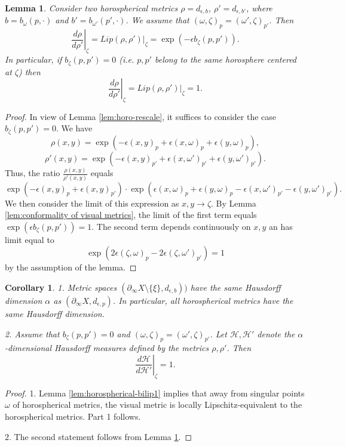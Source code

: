\documentclass[12pt]{amsbook}%
\newtheorem{lem}[thm]{Lemma}
\newtheorem{cor}[thm]{Corollary}
\theoremstyle{definition}
\theoremstyle{remark}
\numberwithin{section}{chapter}
\numberwithin{subsection}{section}
\numberwithin{figure}{chapter}
\def\eps{\epsilon}
\def\cH{{\mathscr{H}}}
\def\al{\alpha}
\def\geo{\partial_\infty}
\begin{document}
\begin{lem}\label{lem:horospherical-bilip2}
Consider two horospherical metrics $\rho=d_{\eps,b}$, $\rho'=d_{\eps,b'}$, where $b=b_\omega(p,\cdot)$ and $b'=b_{\omega'}(p',\cdot)$. We assume that
 $(\omega,\zeta)_p=(\omega',\zeta)_{p'}$. 
Then 
$$
\left. \frac{d\rho}{d\rho'}\right\vert_\zeta= \left. Lip(\rho,\rho')\right\vert_\zeta= \exp(-\eps b_\zeta(p,p')).
$$
In particular, if $b_\zeta(p,p')=0$ (i.e. $p, p'$ belong to the same horosphere centered at $\zeta$) then 
$$
\left. \frac{d\rho}{d\rho'}\right\vert_\zeta= \left. Lip(\rho,\rho')\right\vert_\zeta= 1.
$$
\end{lem}
\begin{proof} In view of Lemma \ref{lem:horo-rescale}, it suffices to consider the case $b_\zeta(p,p')=0$. We have
$$
\rho(x,y)= \exp(-\eps (x,y)_p + \eps (x,\omega)_p + \eps(y,\omega)_p),  
$$
$$
\rho'(x,y)= \exp(-\eps (x,y)_{p'} + \eps (x,\omega')_{p'} + \eps(y,\omega')_{p'}).  
$$
Thus, the ratio $\frac{\rho(x,y)}{\rho'(x,y)}$ equals
$$
\exp(-\eps (x,y)_p + \eps (x,y)_{p'})\cdot \exp( \eps (x,\omega)_p + \eps(y,\omega)_p - \eps (x,\omega')_{p'} - \eps(y,\omega')_{p'}).  
$$
We then consider the limit of this expression as $x,y\to \zeta$. By Lemma 
\ref{lem:conformality of visual metrics}, the limit of the first term equals  $\exp(\eps b_\zeta(p,p'))=1$. The second term depends 
continuously on $x, y$ an has limit equal to 
$$
\exp( 2\eps (\zeta,\omega)_p - 2\eps (\zeta,\omega')_{p'})=1 
$$
by the assumption of the lemma. 
 \end{proof}

\begin{cor}\label{cor:Hausdorff-equal}
1. Metric spaces $(\geo X\setminus \{\xi\}, d_{\eps,b}))$ have the same Hausdorff dimension $\al$ as $(\geo X, d_{\eps,p})$.  In particular, all horospherical metrics have the same Hausdorff dimension. 

2. Assume that $b_\zeta(p,p')=0$ and $(\omega,\zeta)_p=(\omega',\zeta)_{p'}$. Let $\cH, \cH'$ denote the $\al$-dimensional Hausdorff measures defined by the metrics $\rho, \rho'$. Then 
$$
\left. \frac{d\cH}{d\cH'}\right\vert_\zeta=1. 
$$
\end{cor}
\begin{proof} 1. Lemma \ref{lem:horospherical-bilip1} implies that away from singular points $\omega$ of horospherical metrics, the 
visual metric is locally Lipschitz-equivalent to the horospherical metrics.   Part 1 follows.  

2. The second statement follows from Lemma \ref{lem:horospherical-bilip2}. 
\end{proof}
\end{document}
